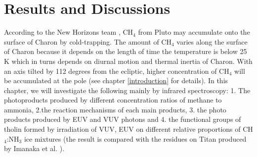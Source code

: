 \chapter{\protect Results and Discussions}
\label{results}
According to the New Horizons team \cite{grundy2016formation}, CH$_4$ from Pluto may accumulate onto the surface of Charon by cold-trapping. The amount of CH$_4$ varies along the surface of Charon because it depends on the length of time the temperature is below 25 K which in turns depends on diurnal motion and thermal inertia of Charon. With an axis tilted by 112 degrees from the ecliptic, higher concentration of CH$_4$ will be accumulated at the pole (see chapter \ref{introduction} for details). In this chapter, we will investigate the following mainly by infrared spectroscopy: 1. The photoproducts produced by different concentration ratios of methane to ammonia, 2.the reaction mechanisms of each main products, 3. the photo products produced by EUV and VUV photons and 4. the functional groups of tholin formed by irradiation of VUV, EUV on different relative proportions of CH$_4$:NH$_3$ ice mixtures (the result is compared with the residues on Titan produced by Imanaka et al. \cite{imanaka2004laboratory}).

